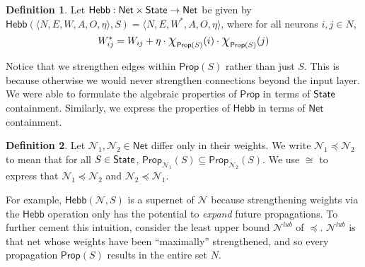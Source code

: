 \documentclass[letterpaper]{article}
\theoremstyle{definition}
\newtheorem{definition}{Definition}
\newcommand{\State}{\mbox{\sf State}}
\newcommand*{\bigchi}{\mbox{\Large$\chi$}}%
\newcommand{\Prop}{\textsf{Prop}}
\newcommand{\Hebb}{\textsf{Hebb}}
\newcommand{\AllNets}{\mathsf{Net}}
\newcommand{\Net}{\mathcal{N}}
\begin{document}
\begin{definition}
\label{def:inc}
Let ${\Hebb : \AllNets \times \State \to \AllNets}$ be given by $\Hebb(\langle N, E, W, A, O, \eta \rangle, S) = \langle N, E, W^\ast, A, O, \eta \rangle$, where for all neurons $i, j \in N$,
\[
    W_{ij}^\ast = W_{ij} + \eta \cdot \bigchi_{\Prop(S)}(i) \cdot  \bigchi_{\Prop(S)}(j)
\]
\end{definition}
Notice that we strengthen edges within $\Prop(S)$ rather than just $S$.  This is because otherwise we would never strengthen connections beyond the input layer.  We were able to formulate the algebraic properties of $\Prop$ in terms of $\State$ containment.  Similarly, we express the properties of $\Hebb$ in terms of $\AllNets$ containment.  

\begin{definition}
Let $\Net_1, \Net_2 \in \AllNets$ differ only in their weights.  We write $\Net_1 \preceq \Net_2$
to mean that for all $S \in \State$, $\Prop_{\Net_1}(S) \subseteq \Prop_{\Net_2}(S)$.  We use $\cong$ to express that $\Net_1 \preceq \Net_2$ and $\Net_2 \preceq \Net_1$.
\end{definition}

For example, $\Hebb(\Net, S)$ is a supernet of $\Net$ because strengthening weights via the $\Hebb$ operation only has the potential to \emph{expand} future propagations.  To further cement this intuition, consider the least upper bound $\mathcal{N}^{lub}$ of $\preceq$.  $\mathcal{N}^{lub}$ is that net whose weights have been ``maximally'' strengthened, and so every propagation $\Prop(S)$ results in the entire set $N$.
\end{document}
